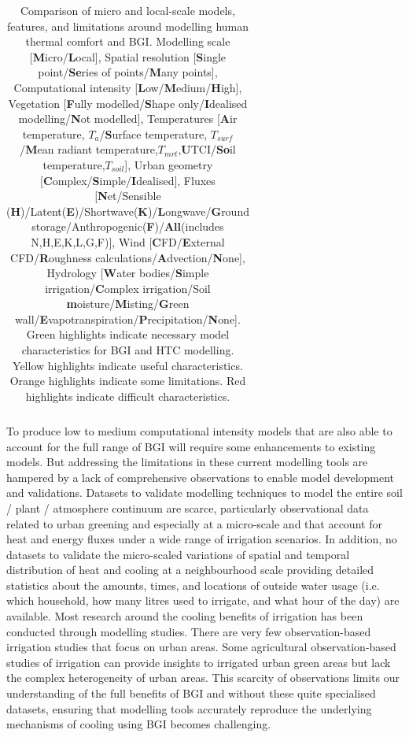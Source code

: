 \begin{table}
\begin{tabular}{c c c c c c c c c c c}
\end{tabular}
\caption{\label{tab:modelcompare}Comparison of micro and local-scale models, features, and limitations around modelling human thermal comfort and BGI. Modelling scale [\textbf{M}icro/\textbf{L}ocal], Spatial resolution [\textbf{S}ingle point/\textbf{Se}ries of points/\textbf{M}any points], Computational intensity [\textbf{L}ow/\textbf{M}edium/\textbf{H}igh], Vegetation [\textbf{F}ully modelled/\textbf{S}hape only/\textbf{I}dealised modelling/\textbf{N}ot modelled], Temperatures [\textbf{A}ir temperature, $T_{a}$/\textbf{S}urface temperature, $T_{surf}$/\textbf{M}ean radiant temperature,$T_{mrt}$,\textbf{U}TCI/\textbf{So}il temperature,$T_{soil}$], Urban geometry [\textbf{C}omplex/\textbf{S}imple/\textbf{I}dealised], Fluxes [\textbf{N}et/Sensible (\textbf{H})/Latent(\textbf{E})/Shortwave(\textbf{K})/\textbf{L}ongwave/\textbf{G}round storage/Anthropogenic(\textbf{F})/\textbf{All}(includes N,H,E,K,L,G,F)], Wind [\textbf{C}FD/\textbf{E}xternal CFD/\textbf{R}oughness calculations/\textbf{A}dvection/\textbf{N}one], Hydrology [\textbf{W}ater bodies/\textbf{S}imple irrigation/\textbf{C}omplex irrigation/Soil \textbf{m}oisture/\textbf{M}isting/\textbf{G}reen wall/\textbf{E}vapotranspiration/\textbf{P}recipitation/\textbf{N}one]. Green highlights indicate necessary model characteristics for BGI and HTC modelling. Yellow highlights indicate useful characteristics. Orange highlights indicate some limitations. Red highlights indicate difficult characteristics.}
\end{table}

To produce low to medium computational intensity models that are also able to account for the full range of BGI will require some enhancements to existing models. But addressing the limitations in these current modelling tools are hampered by a lack of comprehensive observations to enable model development and validations. Datasets to validate modelling techniques to model the entire soil / plant / atmosphere continuum are scarce\cite{Pataki2013}, particularly observational data related to urban greening and especially at a micro-scale and that account for heat and energy fluxes under a wide range of irrigation scenarios. In addition, no datasets to validate the micro-scaled variations of spatial and temporal distribution of heat and cooling at a neighbourhood scale providing detailed statistics about the amounts, times, and locations of outside water usage (i.e. which household, how many litres used to irrigate, and what hour of the day) are available. Most research around the cooling benefits of irrigation has been conducted through modelling studies\cite{Kanamaru2008,Yang2015a,Broadbent2018a}. There are very few observation-based irrigation studies that focus on urban areas\cite{Broadbent2017a}. Some agricultural observation-based studies of irrigation\cite{Chen2018b} can provide insights to irrigated urban green areas but lack the complex heterogeneity of urban areas. This scarcity of observations limits our understanding of the full benefits of BGI and without these quite specialised datasets, ensuring that modelling tools accurately reproduce the underlying mechanisms of cooling using BGI becomes challenging.


